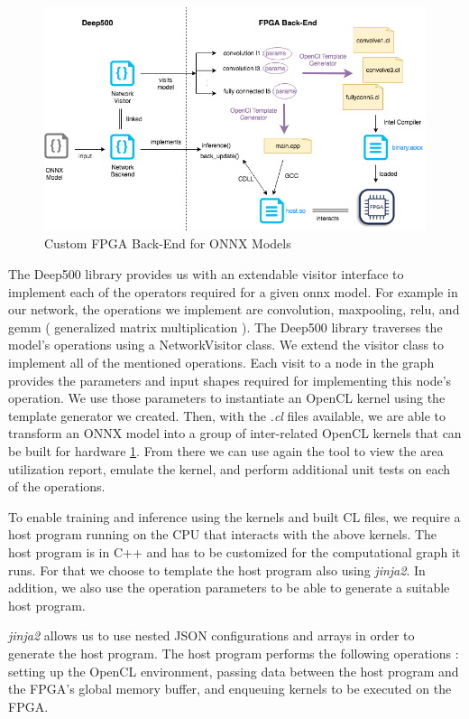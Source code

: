 \begin{figure}[h!]
\centering
\includegraphics[width=1.0\textwidth]{Figures/integration}
\decoRule
\caption[Intergration with Deep500 Diagram]{ Custom FPGA Back-End for ONNX Models }
\label{fig:integration}
\end{figure}

The Deep500 library provides us with an extendable visitor interface to implement each of the operators required for a given onnx model. For example in our network, the operations we implement are convolution, maxpooling, relu, and gemm ( generalized matrix multiplication ). The Deep500 library traverses the model’s operations using a NetworkVisitor class. We extend the visitor class to implement all of the mentioned operations. Each visit to a node in the graph provides the parameters and input shapes required for implementing this node's operation. We use those parameters to instantiate an OpenCL kernel using the template generator we created. Then, with the \emph{.cl} files available, we are able to transform an ONNX model into a group of inter-related OpenCL kernels that can be built for hardware \ref{fig:integration}. From there we can use again the tool to view the area utilization report, emulate the kernel, and perform additional unit tests on each of the operations.

To enable training and inference using the kernels and built CL files, we require a host program running on the CPU that interacts with the above kernels. The host program is in C++ and has to be customized for the computational graph it runs. For that we choose to template the host program also using  \emph{jinja2}. In addition, we also use the operation parameters to be able to generate a suitable host program.  

\emph{jinja2} allows us to use nested JSON configurations and arrays in order to generate the host program. The host program performs the following operations : setting up the OpenCL environment, passing data between the host program and the FPGA's global memory buffer, and enqueuing kernels to be executed on the FPGA.

